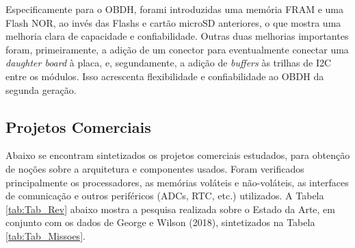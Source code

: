 Especificamente para o OBDH, forami introduzidas uma memória FRAM e uma Flash NOR, ao invés das Flashs e cartão microSD anteriores, o que mostra uma melhoria clara de capacidade e confiabilidade. Outras duas melhorias importantes foram, primeiramente, a adição de um conector para eventualmente conectar uma \textit{daughter board} à placa, e, segundamente, a adição de \textit{buffers} às trilhas de I2C entre os módulos. Isso acrescenta flexibilidade e confiabilidade ao OBDH da segunda geração.

\subsection{Projetos Comerciais}

Abaixo se encontram sintetizados os projetos comerciais estudados, para obtenção de noções sobre a arquitetura e componentes usados. Foram verificados principalmente os processadores, as memórias voláteis e não-voláteis, as interfaces de comunicação e outros periféricos (ADCs, RTC, etc.) utilizados. A Tabela \ref{tab:Tab_Rev} abaixo mostra a pesquisa realizada sobre o Estado da Arte, em conjunto com os dados de George e Wilson (2018), sintetizados na Tabela \ref{tab:Tab_Missoes}.

